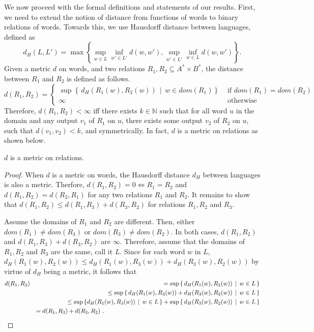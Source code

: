 \documentclass[a4paper,UKenglish,cleveref, autoref, thm-restate,authorcolumns, colorlinks]{lipics-v2021}
\newcommand\dom{\mathit{dom}}
\begin{document}
{We now proceed with the formal definitions and statements of our results. First, we need to extend the notion of distance from functions of words to binary relations of words. 
Towards this, we use Hausdorff distance between languages, defined as \[
d_H(L,L') = \max \left\{ \sup_{w \in L} \inf_{w' \in L'} d(w,w'), \sup_{w' \in L'} \inf_{w \in L} d(w,w') \right\}.
\]
Given a metric $d$ on words, and two relations $R_1,R_2\subseteq A^*\times B^*$, the distance between $R_1$ and $R_2$ is defined as follows.
$$d(R_1,R_2) = \begin{cases} \sup \left \{\,  d_H(R_1(w), R_2(w)) \,\mid\,  w \in \dom(R_1) \right \} & \text{ if $\dom(R_1) = \dom(R_2)$} \\
 \infty & \text{ otherwise } 
 \end{cases}$$
Therefore, $d(R_1,R_2)<\infty$ iff there exists $k\in\mathbb{N}$ such that for all word $u$ in the domain and any output $v_1$ of $R_1$ on $u$, there exists some output $v_2$ of $R_2$ on $u$, such that $d(v_1,v_2)<k$, and symmetrically. In fact, $d$ is a metric on relations as shown below. 
    
\begin{proposition}\label{prop:metricrelations}
    $d$ is a metric on relations.
\end{proposition}
\begin{proof}
    When $d$ is a metric on words, the Hausdorff distance $d_H$ between languages is also a metric. Therfore, $d(R_1,R_2) = 0 \iff R_1 = R_2$ and $d(R_1,R_2) = d(R_2,R_1)$ for any two relations $R_1$ and $R_2$. It remains to show that $d(R_1,R_2) \leq d(R_1,R_3) + d(R_3,R_2)$ for relations $R_1,R_2$ and $R_3$.
  
Assume the domains of $R_1$ and $R_2$ are different. Then, either $\dom(R_1) \neq \dom(R_3)$ or $\dom(R_3) \neq \dom(R_2)$. In both cases, $d(R_1
,R_2)$ and 
$d(R_1,R_3) + d(R_3,R_2)$ are $\infty$. Therefore, assume that the domains of $R_1,R_2$ and $R_3$ are the same, call it $L$. Since for each word $w$ in $L$, $d_H(R_1(w),R_2(w)) \leq d_H(R_1(w),R_3(w)) + d_H(R_3(w),R_2(w))$ by virtue of $d_H$ being a metric, it follows that 
\setlength{\arraycolsep}{0.0em}
\begin{eqnarray*}
d(R_1,R_2) && =\sup\left\{\,d_H(R_1(w),R_2(w)) \,\mid\, w \in L\,\right\} \\
               && \leq \sup\left\{\,d_H(R_1(w),R_3(w)) + d_H(R_3(w),R_2(w))  \,\mid\, w \in L\,\right\}\\
                                          &&\leq \sup\left\{d_H(R_1(w),R_3(w)) \,\mid\, w \in L \,\right\} + \sup \left\{\, d_H(R_3(w),R_2(w))  \,\mid\, w \in L \,\right\} \\
                                          &&=  d(R_1,R_3) + d(R_3,R_2)~. \hspace{9cm}\qedhere
\end{eqnarray*}\setlength{\arraycolsep}{5pt}
\end{proof}

}
\end{document}
